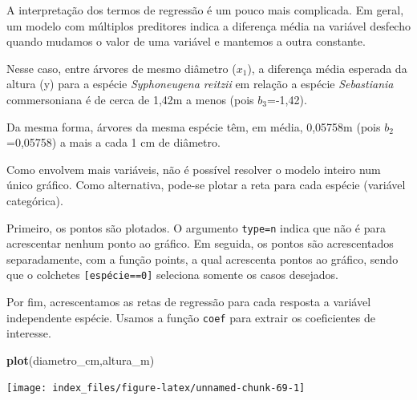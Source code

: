 \documentclass[12pt,brazil,oneside]{book}
\newenvironment{Shaded}{\begin{snugshade}}{\end{snugshade}}
\newcommand{\KeywordTok}[1]{\textcolor[rgb]{0.13,0.29,0.53}{\textbf{#1}}}
\newcommand{\NormalTok}[1]{#1}
\begin{document}
A interpretação dos termos de regressão é um pouco mais complicada. Em geral, um modelo com múltiplos preditores indica a diferença média na variável desfecho quando mudamos o valor de uma variável e mantemos a outra constante.

Nesse caso, entre árvores de mesmo diâmetro (\(x_1\)), a diferença média esperada da altura (y) para a espécie \emph{Syphoneugena reitzii} em relação a espécie \emph{Sebastiania} commersoniana é de cerca de 1,42m a menos (pois \(b_3\)=-1,42).

Da mesma forma, árvores da mesma espécie têm, em média, 0,05758m (pois \(b_2\)=0,05758) a mais a cada 1 cm de diâmetro.

Como envolvem mais variáveis, não é possível resolver o modelo inteiro num único gráfico. Como alternativa, pode-se plotar a reta para cada espécie (variável categórica).

Primeiro, os pontos são plotados. O argumento \texttt{type=\textquotesingle{}n\textquotesingle{}} indica que não é para acrescentar nenhum ponto ao gráfico.
Em seguida, os pontos são acrescentados separadamente, com a função points, a qual acrescenta pontos ao gráfico, sendo que o colchetes \texttt{{[}espécie==0{]}} seleciona somente os casos desejados.

Por fim, acrescentamos as retas de regressão para cada resposta a variável independente espécie. Usamos a função \texttt{coef} para extrair os coeficientes de interesse.

\begin{Shaded}
\begin{Highlighting}[]
\KeywordTok{plot}\NormalTok{(diametro_cm,altura_m)}
\end{Highlighting}
\end{Shaded}

\begin{center}\texttt{[image: index\_files/figure-latex/unnamed-chunk-69-1]} \end{center}
\end{document}
